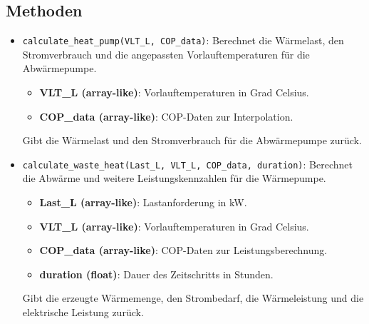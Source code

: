 \subsection{Methoden}
\begin{itemize}
    \item \texttt{calculate\_heat\_pump(VLT\_L, COP\_data)}: Berechnet die Wärmelast, den Stromverbrauch und die angepassten Vorlauftemperaturen für die Abwärmepumpe.
    \begin{itemize}
        \item \textbf{VLT\_L (array-like)}: Vorlauftemperaturen in Grad Celsius.
        \item \textbf{COP\_data (array-like)}: COP-Daten zur Interpolation.
    \end{itemize}
    Gibt die Wärmelast und den Stromverbrauch für die Abwärmepumpe zurück.

    \item \texttt{calculate\_waste\_heat(Last\_L, VLT\_L, COP\_data, duration)}: Berechnet die Abwärme und weitere Leistungskennzahlen für die Wärmepumpe.
    \begin{itemize}
        \item \textbf{Last\_L (array-like)}: Lastanforderung in kW.
        \item \textbf{VLT\_L (array-like)}: Vorlauftemperaturen in Grad Celsius.
        \item \textbf{COP\_data (array-like)}: COP-Daten zur Leistungsberechnung.
        \item \textbf{duration (float)}: Dauer des Zeitschritts in Stunden.
    \end{itemize}
    Gibt die erzeugte Wärmemenge, den Strombedarf, die Wärmeleistung und die elektrische Leistung zurück.


\end{itemize}
